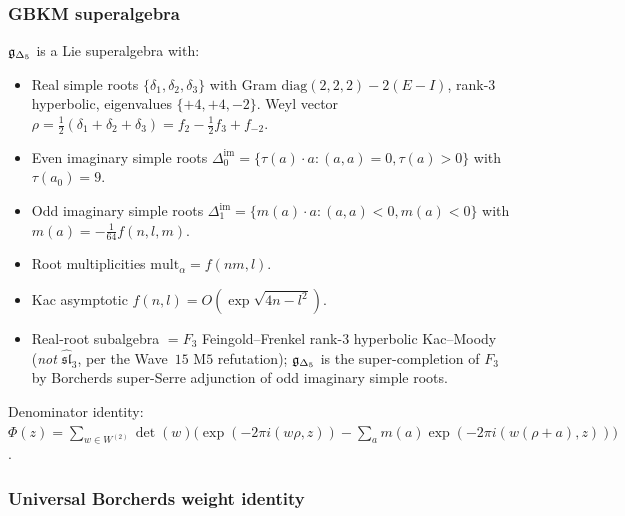 \subsubsection{GBKM superalgebra}

\begin{theorem}\ClaimStatusTheorem
\label{wn:thm:plat-gDelta5}
$\mathfrak{g}_{\Delta_5}$ is a Lie superalgebra with:
\begin{itemize}
\item Real simple roots $\{\delta_1, \delta_2, \delta_3\}$ with Gram
$\mathrm{diag}(2, 2, 2) - 2(E - I)$, rank-$3$ hyperbolic, eigenvalues
$\{+4, +4, -2\}$. Weyl vector $\rho = \tfrac{1}{2}(\delta_1 + \delta_2 + \delta_3)
= f_2 - \tfrac{1}{2} f_3 + f_{-2}$.
\item Even imaginary simple roots $\Delta^{\mathrm{im}}_0 =
\{\tau(a) \cdot a : (a, a) = 0, \tau(a) > 0\}$ with $\tau(a_0) = 9$.
\item Odd imaginary simple roots $\Delta^{\mathrm{im}}_1 =
\{m(a) \cdot a : (a, a) < 0, m(a) < 0\}$ with $m(a) = -\tfrac{1}{64} f(n, l, m)$.
\item Root multiplicities $\mathrm{mult}_\alpha = f(nm, l)$.
\item Kac asymptotic $f(n, l) = O(\exp\sqrt{4n - l^2})$.
\item Real-root subalgebra $= F_3$ Feingold--Frenkel rank-$3$ hyperbolic
Kac--Moody (\emph{not} $\widehat{\mathfrak{sl}}_3$, per the
Wave~$15$ M$5$ refutation); $\mathfrak{g}_{\Delta_5}$ is the super-completion of
$F_3$ by Borcherds super-Serre adjunction of odd imaginary simple roots.
\end{itemize}
Denominator identity: $\Phi(z) =
\sum_{w \in W^{(2)}} \det(w) \bigl(\exp(-2\pi i (w\rho, z))
- \sum_a m(a) \exp(-2\pi i (w(\rho + a), z))\bigr)$.
\end{theorem}

\subsubsection{Universal Borcherds weight identity}

